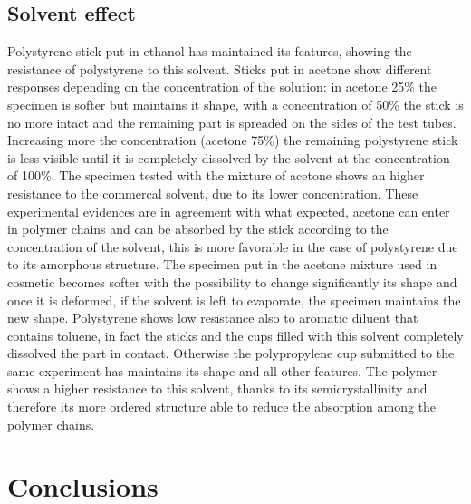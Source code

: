\documentclass[a4paper, 11pt]{article}
\begin{document}
\subsection{Solvent effect}

Polystyrene stick put in ethanol has maintained its features, showing the resistance of polystyrene to this solvent. Sticks put in acetone show different responses depending on the concentration of the solution: in acetone 25\% the specimen is softer but maintains it shape, with a concentration of 50\% the stick is no more intact and the remaining part is spreaded on the sides of the test tubes. Increasing more the concentration (acetone 75\%) the remaining polystyrene stick is less visible until it is completely dissolved by the solvent at the concentration of 100\%. The specimen tested with the mixture of acetone shows an higher resistance to the commercal solvent, due to its lower concentration.
These experimental evidences are in agreement with what expected, acetone can enter in polymer chains and can be absorbed by the stick according to the concentration of the solvent, this is more favorable in the case of polystyrene due to its amorphous structure. The specimen put in the acetone mixture used in cosmetic becomes softer with the possibility to change significantly its shape and once it is deformed, if the solvent is left to evaporate, the specimen maintains the new shape.
Polystyrene shows low resistance also to aromatic diluent that contains toluene, in fact the sticks and the cups filled with this solvent completely dissolved the part in contact. Otherwise the polypropylene cup submitted to the same experiment has maintains its shape and all other features. The polymer shows a higher resistance to this solvent, thanks to its semicrystallinity and therefore its more ordered structure able to reduce the absorption among the polymer chains.

\newpage

\section{Conclusions}
\end{document}
